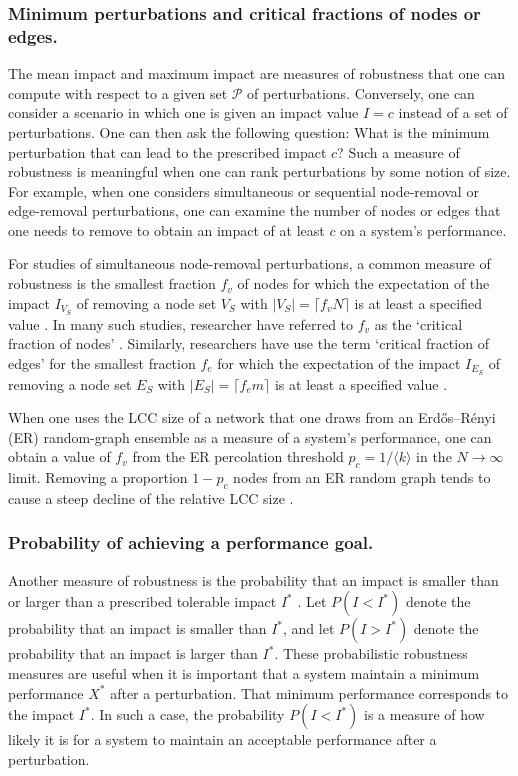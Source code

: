 \documentclass{comnet-mod}
\begin{document}
\subsubsection{Minimum perturbations and critical fractions of nodes or edges.}

The mean impact and maximum impact are measures of robustness that one can compute with respect to a given set $\mathcal P$ of perturbations. Conversely, one can consider a scenario in which one is given an impact value $I = c$ instead of a set of perturbations. One can then ask the following question: What is the minimum perturbation that can lead to the prescribed impact $c$? Such a measure of robustness is meaningful when one can rank perturbations by some notion of size. For example, when one considers simultaneous or sequential node-removal or edge-removal perturbations, one can examine the number of nodes or edges that one needs to remove to obtain an impact of at least $c$ on a system's performance.

For studies of simultaneous node-removal perturbations, a common measure of robustness is the smallest fraction $f_v$ of nodes for which the expectation of the impact $I_{V_S}$ of removing a node set $V_S$ with $|V_S| = \lceil f_vN\rceil$ is at least a specified value \cite{Cohen2000, Dunne2002, Shargel2003, Wang2008}. In many such studies, researcher have referred to $f_v$ as the {`critical fraction of nodes'} \cite{Cohen2000, Albert2002, Buldyrev2010, Danziger2014}. Similarly, researchers have use the term {`critical fraction of edges'} for the smallest fraction $f_e$ for which the expectation of the impact $I_{E_S}$ of removing a node set $E_S$ with $|E_S| = \lceil f_em\rceil$ is at least a specified value \cite{Cozzo2018}. 

When one uses the LCC size of a network that one draws from an Erd\H{o}s--R\'enyi (ER) random-graph ensemble as a measure of a system's performance, one can obtain a value of $f_v$ from the ER percolation threshold $p_c = 1/\langle k\rangle$ in the $N \rightarrow \infty$ limit. Removing a proportion $1 - p_c$ nodes from an ER random graph tends to cause a steep decline of the relative LCC size \cite[p.\,573]{Newman2018}. 



\subsubsection{Probability of achieving a performance goal.}

Another measure of robustness is the probability that an impact is smaller than or larger than a prescribed tolerable impact $I^*$ \cite{Henneaux2015, Henneaux2015a, Panteli2015, Phan2018}. Let $P(I<I^*)$ denote the probability that an impact is smaller than $I^*$, and let $P(I>I^*)$ denote the probability that an impact is larger than $I^*$.
These probabilistic robustness measures are useful when it is important that a system maintain a minimum performance $X^*$ after a perturbation. That minimum performance corresponds to the impact $I^*$.
In such a case, the probability $P(I<I^*)$ is a measure of how likely it is for a system to maintain an acceptable performance after a perturbation. 
\end{document}
